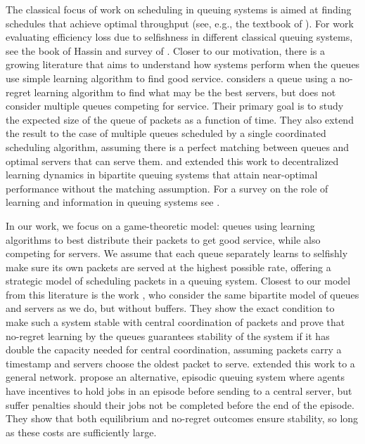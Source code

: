 The classical focus of work on scheduling in queuing systems is aimed at finding schedules that achieve optimal throughput (see, e.g., the textbook of \cite{queuing_theory}). For work evaluating efficiency loss due to selfishness in different classical queuing systems, see the book of Hassin \cite{hassin2020rational} and survey of \cite{hassin2003queue}. Closer to our motivation, there is a growing literature that aims to understand how systems perform when the queues use simple learning algorithm to find good service.  \cite{DBLP:conf/nips/KrishnasamySJS16} considers a queue using a no-regret learning algorithm to find what may be the best servers, but does not consider multiple queues competing for service. Their primary goal is to study the expected size of the queue of packets as a function of time. They also extend the result to the case of multiple queues scheduled by a single coordinated scheduling algorithm, assuming there is a perfect matching between queues and optimal servers that can serve them. \cite{DBLP:conf/nips/SentenacBP21} and \cite{DBLP:conf/colt/FreundLW22} extended this work to decentralized learning dynamics in bipartite queuing systems that attain near-optimal performance without the matching assumption. For a survey on the role of learning and information in queuing systems see \cite{doi:10.1287/educ.2021.0235}. 

In our work, we focus on a game-theoretic model: queues using learning algorithms to best distribute their packets to get good service, while also competing for servers. We assume that each queue separately learns to selfishly make sure its own packets are served at the highest possible rate, offering a strategic model of scheduling packets in a queuing system. Closest to our model from this literature is the work \cite{DBLP:conf/sigecom/GaitondeT20,DBLP:journals/jacm/GaitondeT23}, who consider the same bipartite model of queues and servers as we do, but without buffers. They show the exact condition to make such a system stable with central coordination of packets and prove that no-regret learning by the queues guarantees stability of the system if it has double the capacity needed for central coordination, assuming packets carry a timestamp and servers choose the oldest packet to serve. 
 \cite{DBLP:conf/wine/FuHL22} extended this work to a general network.
 \cite{DBLP:journals/corr/abs-2302-03614}  propose an alternative, episodic queuing system where agents have incentives to hold jobs in an episode before sending to a central server, but suffer penalties should their jobs not be completed before the end of the episode. They show that both equilibrium and no-regret outcomes ensure stability, so long as these costs are sufficiently large. 

